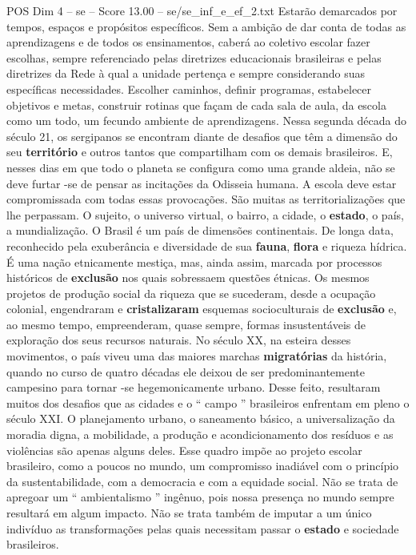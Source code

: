 \begin{textsample}{POS Dim 4 – se – Score 13.00 – se/se\_inf\_e\_ef\_2.txt}
Estarão demarcados por tempos, espaços e propósitos específicos.
Sem a ambição de dar conta de todas as aprendizagens e de todos os ensinamentos, caberá ao coletivo escolar fazer escolhas, sempre referenciado pelas diretrizes educacionais brasileiras e pelas diretrizes da Rede à qual a unidade pertença e sempre considerando suas específicas necessidades.
Escolher caminhos, definir programas, estabelecer objetivos e metas, construir rotinas que façam de cada sala de aula, da escola como um todo, um fecundo ambiente de aprendizagens.
Nessa segunda década do século 21, os sergipanos se encontram diante de desafios que têm a dimensão do seu \textbf{território} e outros tantos que compartilham com os demais brasileiros.
E, nesses dias em que todo o planeta se configura como uma grande aldeia, não se deve furtar -se de pensar as incitações da Odisseia humana.
A escola deve estar compromissada com todas essas provocações.
São muitas as territorializações que lhe perpassam.
O sujeito, o universo virtual, o bairro, a cidade, o \textbf{estado}, o país, a mundialização.
O Brasil é um país de dimensões continentais.
De longa data, reconhecido pela exuberância e diversidade de sua \textbf{fauna}, \textbf{flora} e riqueza hídrica.
É uma nação etnicamente mestiça, mas, ainda assim, marcada por processos históricos de \textbf{exclusão} nos quais sobressaem questões étnicas.
Os mesmos projetos de produção social da riqueza que se sucederam, desde a ocupação colonial, engendraram e \textbf{cristalizaram} esquemas socioculturais de \textbf{exclusão} e, ao mesmo tempo, empreenderam, quase sempre, formas insustentáveis de exploração dos seus recursos naturais.
No século XX, na esteira desses movimentos, o país viveu uma das maiores marchas \textbf{migratórias} da história, quando no curso de quatro décadas ele deixou de ser predominantemente campesino para tornar -se hegemonicamente urbano.
Desse feito, resultaram muitos dos desafios que as cidades e o “ campo ” brasileiros enfrentam em pleno o século XXI.
O planejamento urbano, o saneamento básico, a universalização da moradia digna, a mobilidade, a produção e acondicionamento dos resíduos e as violências são apenas alguns deles.
Esse quadro impõe ao projeto escolar brasileiro, como a poucos no mundo, um compromisso inadiável com o princípio da sustentabilidade, com a democracia e com a equidade social.
Não se trata de apregoar um “ ambientalismo ” ingênuo, pois nossa presença no mundo sempre resultará em algum impacto.
Não se trata também de imputar a um único indivíduo as transformações pelas quais necessitam passar o \textbf{estado} e sociedade brasileiros.

\end{textsample}
